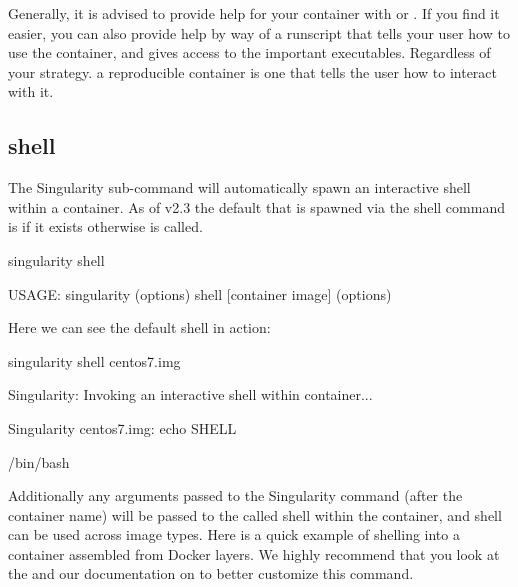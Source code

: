 \documentclass[letterpaper,10pt,english]{sphinxmanual}
\begin{document}
Generally, it is advised to provide help for your container with  or . If
you find it easier, you can also provide help by way of a runscript that
tells your user how to use the container, and gives access to the
important executables. Regardless of your strategy. a reproducible
container is one that tells the user how to interact with it.


\subsection{shell}
\label{\detokenize{appendix:shell}}\label{\detokenize{appendix:shell-command}}
The  Singularity sub-command will automatically spawn an interactive
shell within a container. As of v2.3 the default that is spawned via the
shell command is  if it exists otherwise  is called.

%
\begin{sphinxVerbatim}[commandchars=\\\{\}]
\PYGZdl{} singularity shell

USAGE: singularity (options) shell [container image] (options)
\end{sphinxVerbatim}

Here we can see the default shell in action:

%
\begin{sphinxVerbatim}[commandchars=\\\{\}]
\PYGZdl{} singularity shell centos7.img

Singularity: Invoking an interactive shell within container...


Singularity centos7.img:\PYGZti{}\PYGZgt{} echo \PYGZdl{}SHELL

/bin/bash
\end{sphinxVerbatim}

Additionally any arguments passed to the Singularity command (after the
container name) will be passed to the called shell within the container,
and shell can be used across image types. Here is a quick example of
shelling into a container assembled from Docker layers. We highly
recommend that you look at the  and our documentation on {\hyperref[\detokenize{appendix:singularity-action-flags}]{}} to
better customize this command.
\end{document}
